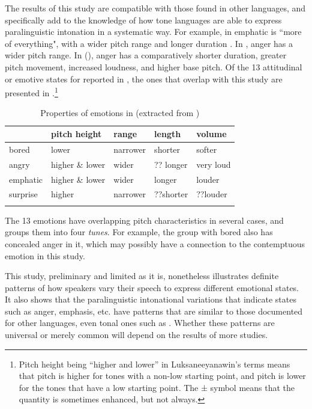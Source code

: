 \documentclass[output=paper]{langsci/langscibook}
\begin{document}
The results of this study are compatible with those found in other languages, and specifically add to the knowledge of how tone languages are able to express paralinguistic intonation in a systematic way. For example, in  emphatic is ``more of everything", with a wider pitch range and longer duration \citep[91]{gibbon1998}.  In  \citep[122--123]{garding1998}, anger has a wider pitch range. In  (\citealt[402, 412--413]{doetal1998,brunelleetal2012}), anger has a comparatively shorter duration, greater pitch movement, increased loudness, and higher base pitch. Of the 13 attitudinal or emotive states for  reported in \citet[382]{luksaneeyanawin1998}, the ones that overlap with this study are presented in .\footnote{Pitch height being ``higher and lower'' in Luksaneeyanawin's terms means that pitch is higher for tones with a non-low starting point, and pitch is lower for the tones that have a low starting point. The ± symbol means that the quantity is sometimes enhanced, but not always.}


\begin{table}
\begin{tabular}{lllll}
\lsptoprule
 & pitch height & range & length & volume\\\midrule
bored & lower & narrower & shorter & softer\\
angry & higher \& lower & wider & ?? longer & very loud\\
emphatic & higher \& lower & wider & longer & louder\\
surprise & higher & narrower & ??shorter & ??louder\\
\lspbottomrule
\end{tabular}

\caption{Properties of emotions in  (extracted from \citealt[382]{luksaneeyanawin1998})}
\label{tab:6.cahill}

\end{table}



The 13 emotions have overlapping pitch characteristics in several cases, and \citeauthor{luksaneeyanawin1998} groups them into four \emph{tunes}. For example, the group with bored also has concealed anger in it, which may possibly have a connection to the contemptuous emotion in this study.

This study, preliminary and limited as it is, nonetheless illustrates definite patterns of how  speakers vary their speech to express different emotional states. It also shows that the paralinguistic intonational variations that indicate states such as anger, emphasis, etc. have patterns that are similar to those documented for other languages, even tonal ones such as . Whether these patterns are universal or merely common will depend on the results of more studies.
\end{document}
